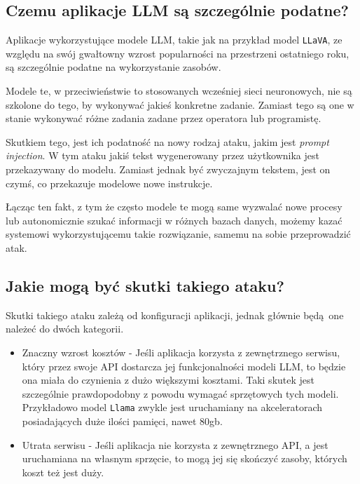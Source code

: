 \documentclass[12pt,a4paper]{article}
\begin{document}
\subsection*{Czemu aplikacje LLM są szczególnie podatne?}

Aplikacje wykorzystujące modele LLM, takie jak na przykład model
\texttt{LLaVA}\cite{liu2023improvedllava}, ze względu 
na swój gwałtowny wzrost popularności na przestrzeni ostatniego roku, są
szczególnie podatne na wykorzystanie zasobów.

Modele te, w przeciwieństwie to stosowanych wcześniej sieci neuronowych, nie są
szkolone do tego, by wykonywać jakieś konkretne zadanie. Zamiast tego 
są one w stanie wykonywać różne zadania zadane przez operatora lub programistę.

Skutkiem tego, jest ich podatność na nowy rodzaj ataku, jakim jest \emph{prompt
injection}\cite{greshake2023youve}. W tym ataku jakiś tekst wygenerowany przez 
użytkownika jest przekazywany do modelu. Zamiast jednak być zwyczajnym tekstem, 
jest on czymś, co przekazuje modelowe nowe instrukcje.

Łącząc ten fakt, z tym że często modele te mogą same wyzwalać nowe procesy lub
autonomicznie szukać informacji w różnych bazach danych, możemy kazać systemowi 
wykorzystującemu takie rozwiązanie, samemu na sobie przeprowadzić atak.

\subsection*{Jakie mogą być skutki takiego ataku?}

Skutki takiego ataku zależą od konfiguracji aplikacji, jednak głównie będą one
należeć do dwóch kategorii.

\begin{itemize}
  \item Znaczny wzrost kosztów - Jeśli aplikacja korzysta z zewnętrznego
    serwisu, który przez swoje API dostarcza jej funkcjonalności modeli LLM, to 
    będzie ona miała do czynienia z dużo większymi kosztami. Taki skutek jest
    szczególnie prawdopodobny z powodu wymagać sprzętowych tych modeli.
    Przykładowo model \texttt{Llama} zwykle jest uruchamiany na akceleratorach 
    posiadających duże ilości pamięci\cite{touvron2023llama}, nawet 80gb.
  \item Utrata serwisu - Jeśli aplikacja nie korzysta z zewnętrznego API, a jest
    uruchamiana na własnym sprzęcie, to mogą jej się skończyć zasoby, których
    koszt też jest duży. 
\end{itemize}
\end{document}

